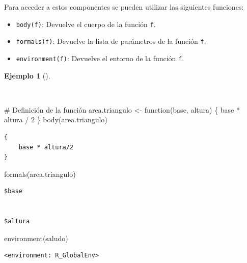 \documentclass[
  a4paper,
]{scrreport}
\newenvironment{Shaded}{\begin{snugshade}}{\end{snugshade}}
\newcommand{\CommentTok}[1]{\textcolor[rgb]{0.37,0.37,0.37}{#1}}
\newcommand{\ControlFlowTok}[1]{\textcolor[rgb]{0.00,0.23,0.31}{#1}}
\newcommand{\DecValTok}[1]{\textcolor[rgb]{0.68,0.00,0.00}{#1}}
\newcommand{\FunctionTok}[1]{\textcolor[rgb]{0.28,0.35,0.67}{#1}}
\newcommand{\NormalTok}[1]{\textcolor[rgb]{0.00,0.23,0.31}{#1}}
\newcommand{\OtherTok}[1]{\textcolor[rgb]{0.00,0.23,0.31}{#1}}
\newcommand{\SpecialCharTok}[1]{\textcolor[rgb]{0.37,0.37,0.37}{#1}}
\providecommand{\tightlist}{%
  \setlength{\itemsep}{0pt}\setlength{\parskip}{0pt}}\usepackage{longtable,booktabs,array}
\theoremstyle{definition}
\theoremstyle{definition}
\newtheorem{example}{Ejemplo}[chapter]
\theoremstyle{remark}
\begin{document}
Para acceder a estos componentes se pueden utilizar las siguientes
funciones:

\begin{itemize}
\tightlist
\item
  \texttt{body(f)}: Devuelve el cuerpo de la función \texttt{f}.
\item
  \texttt{formals(f)}: Devuelve la lista de parámetros de la función
  \texttt{f}.
\item
  \texttt{environment(f)}: Devuelve el entorno de la función \texttt{f}.
\end{itemize}

\begin{example}[]\protect\hypertarget{exm-componentes-funcion}{}\label{exm-componentes-funcion}

~

\begin{Shaded}
\begin{Highlighting}[]
\CommentTok{\# Definición de la función}
\NormalTok{area.triangulo }\OtherTok{\textless{}{-}} \ControlFlowTok{function}\NormalTok{(base, altura) \{}
\NormalTok{  base }\SpecialCharTok{*}\NormalTok{ altura }\SpecialCharTok{/} \DecValTok{2}
\NormalTok{\}}
\FunctionTok{body}\NormalTok{(area.triangulo)}
\end{Highlighting}
\end{Shaded}

\begin{verbatim}
{
    base * altura/2
}
\end{verbatim}

\begin{Shaded}
\begin{Highlighting}[]
\FunctionTok{formals}\NormalTok{(area.triangulo)}
\end{Highlighting}
\end{Shaded}

\begin{verbatim}
$base


$altura
\end{verbatim}

\begin{Shaded}
\begin{Highlighting}[]
\FunctionTok{environment}\NormalTok{(saludo)}
\end{Highlighting}
\end{Shaded}

\begin{verbatim}
<environment: R_GlobalEnv>
\end{verbatim}

\end{example}
\end{document}
